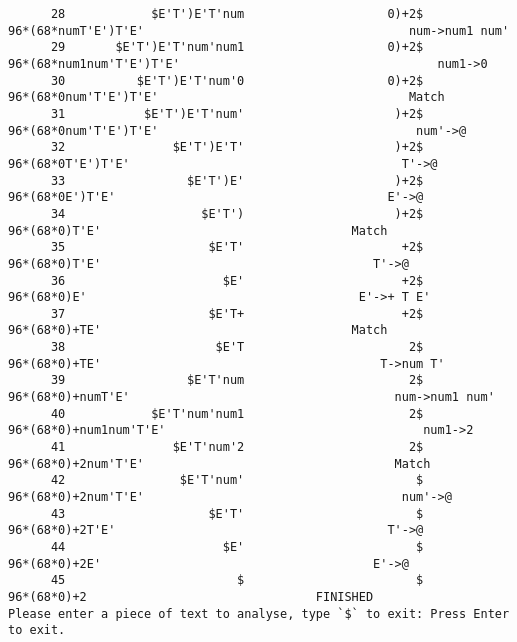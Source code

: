 \documentclass[UTF8]{ctexart}
\begin{document}
\begin{lstlisting}
      28            $E'T')E'T'num                    0)+2$                       96*(68*numT'E')T'E'                                     num->num1 num'
      29       $E'T')E'T'num'num1                    0)+2$                       96*(68*num1num'T'E')T'E'                                    num1->0
      30          $E'T')E'T'num'0                    0)+2$                       96*(68*0num'T'E')T'E'                                   Match
      31           $E'T')E'T'num'                     )+2$                      96*(68*0num'T'E')T'E'                                    num'->@
      32               $E'T')E'T'                     )+2$                      96*(68*0T'E')T'E'                                      T'->@
      33                 $E'T')E'                     )+2$                      96*(68*0E')T'E'                                      E'->@
      34                   $E'T')                     )+2$                      96*(68*0)T'E'                                   Match
      35                    $E'T'                      +2$                     96*(68*0)T'E'                                      T'->@
      36                      $E'                      +2$                     96*(68*0)E'                                      E'->+ T E'
      37                    $E'T+                      +2$                     96*(68*0)+TE'                                   Match
      38                     $E'T                       2$                    96*(68*0)+TE'                                       T->num T'
      39                 $E'T'num                       2$                    96*(68*0)+numT'E'                                     num->num1 num'
      40            $E'T'num'num1                       2$                    96*(68*0)+num1num'T'E'                                    num1->2
      41               $E'T'num'2                       2$                    96*(68*0)+2num'T'E'                                   Match
      42                $E'T'num'                        $                   96*(68*0)+2num'T'E'                                    num'->@
      43                    $E'T'                        $                   96*(68*0)+2T'E'                                      T'->@
      44                      $E'                        $                   96*(68*0)+2E'                                      E'->@
      45                        $                        $                   96*(68*0)+2                                FINISHED
Please enter a piece of text to analyse, type `$` to exit: Press Enter to exit.
    \end{lstlisting}
\end{document}

